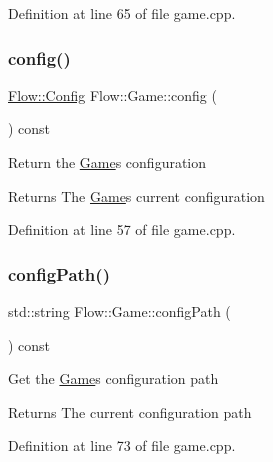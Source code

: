 Definition at line 65 of file game.\+cpp.

\hypertarget{class_flow_1_1_game_a032b087aa124b6882a260c264d3d3922}{}\label{class_flow_1_1_game_a032b087aa124b6882a260c264d3d3922} 
\subsubsection{\texorpdfstring{config()}{config()}\hspace{0.1cm}{\footnotesize\ttfamily [2/2]}}
{\footnotesize\ttfamily \hyperlink{struct_flow_1_1_config}{Flow\+::\+Config} Flow\+::\+Game\+::config (\begin{DoxyParamCaption}{ }\end{DoxyParamCaption}) const}

Return the \hyperlink{class_flow_1_1_game}{Game}\textquotesingle{}s configuration \begin{DoxyReturn}{Returns}
The \hyperlink{class_flow_1_1_game}{Game}\textquotesingle{}s current configuration 
\end{DoxyReturn}


Definition at line 57 of file game.\+cpp.

\hypertarget{class_flow_1_1_game_a447cb57574a380a17d26087d10151c5c}{}\label{class_flow_1_1_game_a447cb57574a380a17d26087d10151c5c} 
\subsubsection{\texorpdfstring{config\+Path()}{configPath()}}
{\footnotesize\ttfamily std\+::string Flow\+::\+Game\+::config\+Path (\begin{DoxyParamCaption}{ }\end{DoxyParamCaption}) const}

Get the \hyperlink{class_flow_1_1_game}{Game}\textquotesingle{}s configuration path \begin{DoxyReturn}{Returns}
The current configuration path 
\end{DoxyReturn}


Definition at line 73 of file game.\+cpp.

\hypertarget{class_flow_1_1_game_a580e2eabf342b6d3ac7436797ddc888b}{}\label{class_flow_1_1_game_a580e2eabf342b6d3ac7436797ddc888b} 
